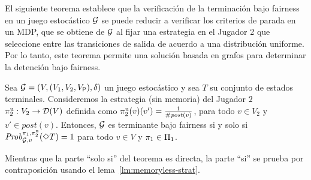 El siguiente teorema establece que la verificación de la terminación bajo fairness en un juego estocástico $\mathcal{G}$ se puede reducir a verificar los criterios de parada en un MDP, que se obtiene de $\mathcal{G}$ al fijar una estrategia en el Jugador 2 que seleccione entre las transiciones de salida de acuerdo a una
distribución uniforme. Por lo tanto, este teorema permite una solución basada en grafos para determinar la detención bajo fairness.


\begin{theorem}\label{thm:uniform-prob}
  Sea $\mathcal{G} = (V, (V_1, V_2, V_{\mathsf{P}}), \delta)$ un juego estocástico y sea $T$ su conjunto de estados terminales.
  Consideremos la estrategia (sin memoria) del Jugador $2$
  $\pi^{\mathrm{u}}_{2} : V_2 \rightarrow \mathcal{D}(V)$ definida como
  $\pi^{\mathrm{u}}_{2}(v)(v') = \frac{1}{\# \mathit{post}(v)}$, para todo $v \in
  V_2$ y $v' \in post(v)$.
  Entonces, $\mathcal{G}$ es terminante bajo fairness si y solo si
  $\mathit{Prob}^{\pi_{1}, \pi^{\mathrm{u}}_{2}}_{\mathcal{G},v}(\Diamond T)=1$ para
  todo $v\in V$ y $\pi_{1} \in \Pi_{1}$.
\end{theorem}

Mientras que la parte ``solo si'' del teorema es directa, la parte ``si'' se prueba por
contraposición usando el lema~\ref{lm:memoryless-strat}.

